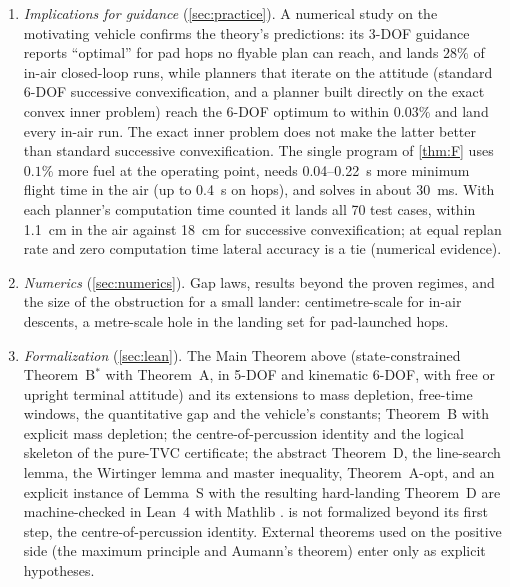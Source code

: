 \begin{enumerate}[leftmargin=*,itemsep=2pt]
coplanar subclass, together with counterexamples to exactness in general. Finally, for the pure-TVC body with depleting mass we give
a single SOCP in centre-of-percussion coordinates, with the actuator limits as convex restrictions on B\'ezier control tuples, and
prove that all its feasible points are trajectories of the model within the limits at every instant (\cref{thm:F}); by
\cref{thm:A} it cannot also be complete (\cref{prop:F-inc}).
\item \emph{Implications for guidance} (\cref{sec:practice}). A numerical study on the motivating vehicle confirms the theory's
predictions: its 3-DOF guidance reports ``optimal'' for pad hops no flyable plan can reach, and lands $28\%$ of in-air closed-loop runs,
while planners that iterate on the attitude (standard 6-DOF successive convexification, and a planner built directly on the exact
convex inner problem) reach the 6-DOF optimum to within $0.03\%$ and land every in-air run. The exact inner problem does not make the
latter better than standard successive convexification. The single program of \cref{thm:F} uses $0.1\%$ more fuel at the operating
point, needs 0.04--0.22~s more minimum flight time in the air (up to 0.4~s on hops), and solves in about 30~ms. With each planner's
computation time counted it lands all 70 test cases, within 1.1~cm in the air against 18~cm for successive convexification; at equal
replan rate and zero computation time lateral accuracy is a tie (numerical evidence).
\item \emph{Numerics} (\cref{sec:numerics}). Gap laws, results beyond the proven regimes, and the size of the
obstruction for a small lander: centimetre-scale for in-air descents, a metre-scale hole in the landing set for
pad-launched hops.
\item \emph{Formalization} (\cref{sec:lean}). The Main Theorem above (state-constrained Theorem~B$^*$ with Theorem~A, in 5-DOF and
kinematic 6-DOF, with free or upright terminal attitude) and its extensions to mass depletion, free-time windows, the
quantitative gap and the vehicle's constants; Theorem~B with explicit mass depletion; the centre-of-percussion identity and the
logical skeleton of the pure-TVC certificate; the abstract Theorem~D, the
line-search lemma, the Wirtinger lemma and master inequality, Theorem~A-opt, and an explicit instance of Lemma~S with the resulting
hard-landing Theorem~D are machine-checked in Lean~4 with Mathlib \cite{demoura2021lean4,mathlib2020}.  is not
formalized beyond its first step, the centre-of-percussion identity.
External theorems used on the positive side (the maximum principle and Aumann's theorem) enter only as explicit
hypotheses.
\end{enumerate}

